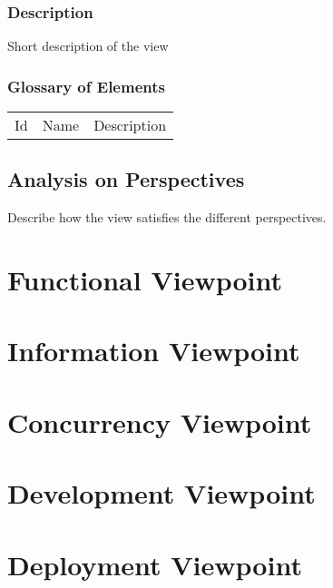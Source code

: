 \documentclass{article}
\begin{document}
\subsubsection*{Description}
Short description of the view

\subsubsection*{Glossary of Elements}
\begin{longtable}{lll}
Id & Name & Description \\
\end{longtable}

\subsection*{Analysis on Perspectives}
Describe how the view satisfies the different perspectives. 

\section{Functional Viewpoint}

\section*{Information Viewpoint}

\section*{Concurrency Viewpoint}

\section*{Development Viewpoint}

\section*{Deployment Viewpoint}
\end{document}
